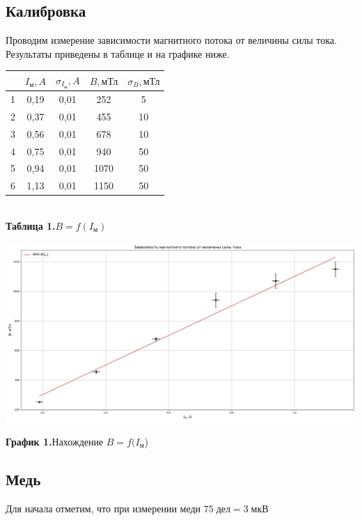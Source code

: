 \documentclass[a4paper,12pt]{article}
\theoremstyle{definition}
\begin{document}
\subsection{Калибровка}
Проводим измерение зависимости магнитного потока от величины силы тока. Результаты приведены в таблице и на графике ниже.\\
\begin{center}
\begin{tabular}{|c|c|c|c|c|}
\hline
 & $I_{\text{м}}, A$ & $\sigma_{I_{\text{м}}}, A$ & $B, \text{мТл}$ & $\sigma_{B}, \text{мТл}$ \\ \hline
1 & 0,19 & 0,01 & 252 & 5 \\ \hline
2 & 0,37 & 0,01 & 455 & 10 \\ \hline
3 & 0,56 & 0,01 & 678 & 10 \\ \hline
4 & 0,75 & 0,01 & 940 & 50 \\ \hline
5 & 0,94 & 0,01 & 1070 & 50 \\ \hline
6 & 1,13 & 0,01 & 1150 & 50 \\ \hline
\end{tabular}\\
\textbf{Таблица 1.}$B = f(I_{\text{м}})$

\end{center}
\includegraphics[width = \textwidth]{graph1.png}
\begin{center}
\textbf{График 1.}Нахождение $B = f(I_{\text{м}}$)
\end{center}

\subsection{Медь}

    \par Для начала отметим, что при измерении меди $75\; \text{дел} = 3\; \text{мкВ}$
    
\end{document}
